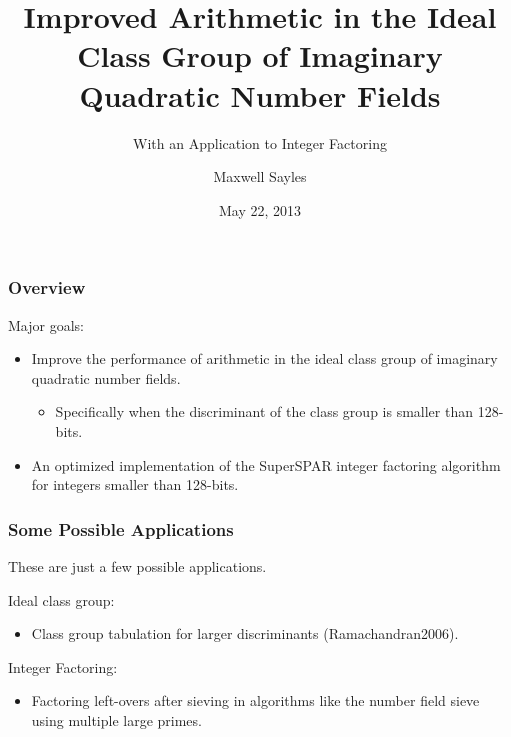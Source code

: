 \documentclass{beamer}
\title[Ideal Class Group]{Improved Arithmetic in the Ideal Class Group of Imaginary Quadratic Number Fields}
\subtitle{With an Application to Integer Factoring}
\author{Maxwell Sayles}
\date{May 22, 2013}
\institute{
	\bigskip 
       Department of Computer Science \\
       University of Calgary
}
\begin{document}
\maketitle

\begin{frame}
\frametitle{Overview}

Major goals:
\begin{itemize}
\item Improve the performance of arithmetic in the ideal class group of imaginary quadratic number fields.
	\begin{itemize}
	\item Specifically when the discriminant of the class group is smaller than 128-bits.
	\end{itemize}
\item An optimized implementation of the SuperSPAR integer factoring algorithm for integers smaller than 128-bits.
\end{itemize}

\end{frame}

\begin{frame}
\frametitle{Some Possible Applications}
These are just a few possible applications. \bigskip

Ideal class group:
\begin{itemize}
\item Class group tabulation for larger discriminants \break (Ramachandran2006).
\end{itemize}

\bigskip
Integer Factoring:
\begin{itemize}
\item Factoring left-overs after sieving in algorithms like the number field sieve using multiple large primes.
\end{itemize}

\end{frame}
\end{document}
